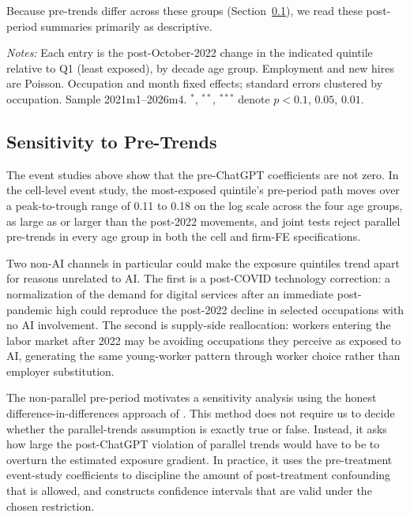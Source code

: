 \documentclass[12pt]{article}
\begin{document}
Because pre-trends differ across these groups (Section~\ref{sec:regression:robust}), we read these post-period summaries primarily as descriptive.

\begin{table}[tp]
  \centering
  \caption{Cell-level difference-in-differences by AI-exposure quintile and decade age group, private sector.}
  \label{tab:did_cell}
  
  \begin{minipage}{\textwidth}\footnotesize\textit{Notes:} Each entry is the post-October-2022 change in the indicated quintile relative to Q1 (least exposed), by decade age group. Employment and new hires are Poisson. Occupation and month fixed effects; standard errors clustered by occupation. Sample 2021m1--2026m4. $^{*}$, $^{**}$, $^{***}$ denote $p<0.1$, $0.05$, $0.01$.\end{minipage}
\end{table}

\subsection{Sensitivity to Pre-Trends}\label{sec:regression:robust}

The event studies above show that the pre-ChatGPT coefficients are not zero. In the cell-level event study, the most-exposed quintile's pre-period path moves over a peak-to-trough range of 0.11 to 0.18 on the log scale across the four age groups, as large as or larger than the post-2022 movements, and joint tests reject parallel pre-trends in every age group in both the cell and firm-FE specifications.

Two non-AI channels in particular could make the exposure quintiles trend apart for reasons unrelated to AI. The first is a post-COVID technology correction: a normalization of the demand for digital services after an immediate post-pandemic high could reproduce the post-2022 decline in selected occupations with no AI involvement. The second is supply-side reallocation: workers entering the labor market after 2022 may be avoiding occupations they perceive as exposed to AI, generating the same young-worker pattern through worker choice rather than employer substitution.

The non-parallel pre-period motivates a sensitivity analysis using the honest difference-in-differences approach of \citet{rambachan2023}. This method does not require us to decide whether the parallel-trends assumption is exactly true or false. Instead, it asks how large the post-ChatGPT violation of parallel trends would have to be to overturn the estimated exposure gradient. In practice, it uses the pre-treatment event-study coefficients to discipline the amount of post-treatment confounding that is allowed, and constructs confidence intervals that are valid under the chosen restriction.
\end{document}
